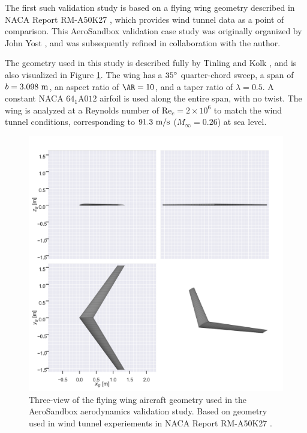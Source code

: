 The first such validation study is based on a flying wing geometry described in NACA Report RM-A50K27 \cite{tinling_effects_1951}, which provides wind tunnel data as a point of comparison. This AeroSandbox validation case study was originally organized by John Yost \cite{yost2022}, and was subsequently refined in collaboration with the author.

The geometry used in this study is described fully by Tinling and Kolk \cite{tinling_effects_1951}, and is also visualized in Figure \ref{fig:fw_geometry}. The wing has a $35\degree$ quarter-chord sweep, a span of $b=3.098\ \rm m$, an aspect ratio of $\AR = 10$, and a taper ratio of $\lambda=0.5$. A constant NACA $\mathrm{64_{1}A012}$ airfoil is used along the entire span, with no twist. The wing is analyzed at a Reynolds number of $\text{Re}_c=2 \times 10^6$ to match the wind tunnel conditions, corresponding to $91.3\ \rm m/s$ ($M_\infty=0.26$) at sea level.

\begin{figure}[H]
    \centering
    \includegraphics[width=5in]{../figures/aero_validation/flying_wing_geometry.png}
    \caption{Three-view of the flying wing aircraft geometry used in the AeroSandbox aerodynamics validation study. Based on geometry used in wind tunnel experiements in NACA Report RM-A50K27 \cite{tinling_effects_1951}.}
    \label{fig:fw_geometry}
\end{figure}

